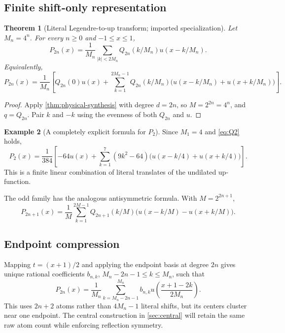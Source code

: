 \documentclass[11pt,oneside]{article}
\numberwithin{equation}{section}
\newtheorem{theorem}{Theorem}[section]
\theoremstyle{definition}
\newtheorem{example}[theorem]{Example}
\theoremstyle{remark}
\begin{document}
\subsection{Finite shift-only representation}

\begin{theorem}[Literal Legendre-to-up transform; imported specialization]
\label{thm:literal-legendre}
Let $M_n=4^n$.  For every $n\ge0$ and $-1\le x\le1$,
\begin{equation}
 \boxed{
 P_{2n}(x)=\frac1{M_n}\sum_{|k|<2M_n}
 Q_{2n}(k/M_n)u(x-k/M_n).}
 \label{eq:literal-legendre}
\end{equation}
Equivalently,
\begin{equation}
 P_{2n}(x)=\frac1{M_n}\left[
 Q_{2n}(0)u(x)+\sum_{k=1}^{2M_n-1}Q_{2n}(k/M_n)
 \bigl(u(x-k/M_n)+u(x+k/M_n)\bigr)\right].
 \label{eq:literal-legendre-parity}
\end{equation}
\end{theorem}

\begin{proof}
Apply \cref{thm:physical-synthesis} with degree $d=2n$, so
$M=2^{2n}=4^n$, and $q=Q_{2n}$.  Pair $k$ and $-k$ using the evenness of both
$Q_{2n}$ and $u$.
\end{proof}

\begin{example}[A completely explicit formula for $P_2$]
Since $M_1=4$ and \eqref{eq:Q2} holds,
\begin{equation}
 \boxed{
 P_2(x)=\frac1{384}\left[-64u(x)+
 \sum_{k=1}^{7}(9k^2-64)\bigl(u(x-k/4)+u(x+k/4)\bigr)\right].}
 \label{eq:P2-literal}
\end{equation}
This is a finite linear combination of literal translates of the undilated
up-function.
\end{example}

The odd family has the analogous antisymmetric formula.  With
$M=2^{2n+1}$,
\begin{equation}
 P_{2n+1}(x)=\frac1M\sum_{k=1}^{2M-1}Q_{2n+1}(k/M)
 \bigl(u(x-k/M)-u(x+k/M)\bigr).
 \label{eq:odd-literal}
\end{equation}

\subsection{Endpoint compression}

Mapping $t=(x+1)/2$ and applying the endpoint basis at degree $2n$ gives
unique rational coefficients $b_{n,k}$, $M_n-2n-1\le k\le M_n$, such that
\begin{equation}
 P_{2n}(x)=\frac1{M_n}
 \sum_{k=M_n-2n-1}^{M_n}b_{n,k}
 u\!\left(\frac{x+1-2k}{2M_n}\right).
 \label{eq:endpoint-legendre}
\end{equation}
This uses $2n+2$ atoms rather than $4M_n-1$ literal shifts, but its centers
cluster near one endpoint.  The central construction in \cref{sec:central}
will retain the same raw atom count while enforcing reflection symmetry.
\end{document}
